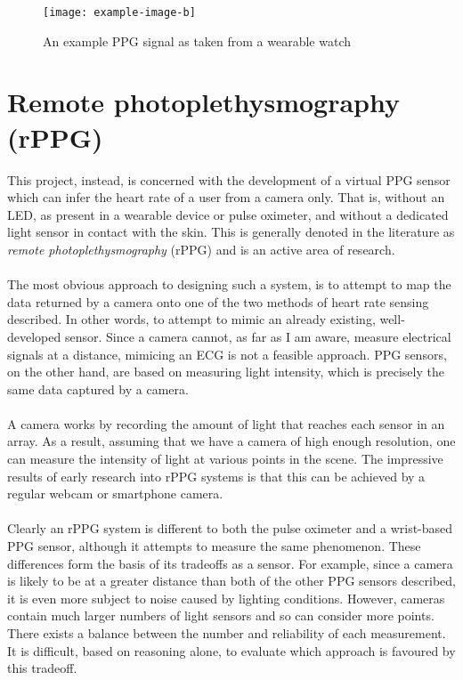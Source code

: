 \begin{figure}[H]
    \texttt{[image: example-image-b]}
   \caption{An example PPG signal as taken from a wearable watch} 
\end{figure}
\section{Remote photoplethysmography (rPPG)}
This project, instead, is concerned with the development of a virtual PPG sensor which can infer the heart rate of a user from a camera only.
That is, without an LED, as present in a wearable device or pulse oximeter, and without a dedicated light sensor in contact with the skin. 
This is generally denoted in the literature as \textit{remote photoplethysmography} (rPPG) and is an active area of research.
\\\\
The most obvious approach to designing such a system, is to attempt to map the data returned by a camera onto one of the two methods of heart rate sensing described. In other words, to attempt 
to mimic an already existing, well-developed sensor.
Since a camera cannot, as far as I am aware, measure electrical signals at a distance, mimicing an ECG is not a feasible approach. PPG sensors, on the other hand, are based on measuring light intensity, which is precisely the same data captured by a camera.
\\\\
A camera works by recording the amount of light that reaches each sensor in an array. As a result, assuming that we have a camera of high enough resolution, one can measure the intensity of light 
at various points in the scene. The impressive results of early research into rPPG systems is that this can be achieved by a regular webcam or smartphone camera.
\\\\
Clearly an rPPG system is different to both the pulse oximeter and a wrist-based PPG sensor, although it attempts to measure the same phenomenon.
These differences form the basis of its tradeoffs as a sensor. For example, since a camera is likely to be at a greater distance than both of the other PPG sensors described, it is even more
subject to noise caused by lighting conditions. However, cameras contain much larger numbers of light sensors and so can consider more points. There exists a balance between the number and 
reliability of each measurement. It is difficult, based on reasoning alone, to evaluate which approach is favoured by this tradeoff. 

